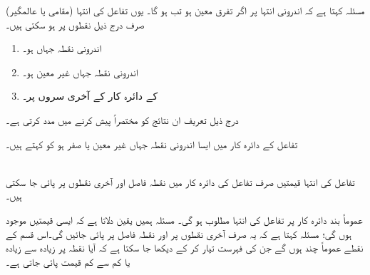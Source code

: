 مسئلہ  کہتا ہے کہ اندرونی انتہا پر اگر تفرق معین ہو تب  ہو گا۔ یوں تفاعل کی انتہا (مقامی یا عالمگیر) صرف درج ذیل نقطوں پر ہو سکتی ہیں۔
\begin{enumerate}[1.]
\item
اندرونی نقطہ جہاں  ہو۔\\
\item
اندرونی نقطہ جہاں  غیر معین ہو۔\\
\item
{} کے دائرہ کار کے آخری سروں پر۔
\end{enumerate}

درج ذیل تعریف ان نتائج کو مختصراً پیش کرنے میں مدد کرتی ہے۔

تفاعل  کے دائرہ کار میں ایسا اندرونی نقطہ جہاں  غیر معین یا صفر ہو کو  کہتے ہیں۔ 

\\
تفاعل کی انتہا قیمتیں صرف تفاعل کی دائرہ کار میں نقطہ فاصل اور آخری نقطوں  پر پائی جا سکتی ہیں۔ 

عموماً بند دائرہ کار پر تفاعل  کی انتہا  مطلوب ہو گی۔ مسئلہ  ہمیں یقین دلاتا ہے کہ ایسی قیمتیں موجود ہوں گی؛  مسئلہ  کہتا ہے کہ یہ صرف آخری نقطوں پر اور نقطہ فاصل پر پائی جائیں گی۔اس قسم کے نقطے عموماً چند ہوں گے جن کی فہرست تیار کر کے دیکھا جا سکتا ہے کہ آیا نقطہ پر زیادہ سے زیادہ یا کم سے کم قیمت پائی جاتی ہے۔

